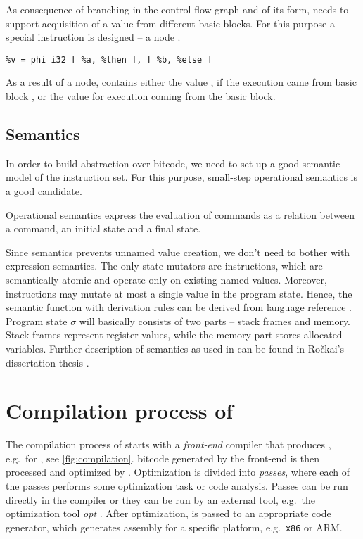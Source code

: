 As consequence of branching in the control flow graph and of its \SSA form, \LLVM needs to
support acquisition of a value from different basic blocks. For this
purpose a special instruction is designed -- a  node \cite{Cytron91}.

\begin{verbatim}
%v = phi i32 [ %a, %then ], [ %b, %else ]
\end{verbatim}

As a result of a  node,  contains either the value ,
if the execution came from basic block , or the value  for execution
coming from the  basic block.

\subsection{Semantics} \label{subsec:semantics}

In order to build abstraction over \LLVM bitcode, we need to set up a good
semantic model of the instruction set. For this purpose, small-step operational
semantics \cite{Plotkin04} is a good candidate.

\begin{definition}
Operational semantics express the evaluation of commands as a relation between
a command, an initial state and a final state.
\end{definition}

\noindent
Since \LLVMIR semantics prevents unnamed value creation, we don't need to
bother with expression semantics. The only state mutators are instructions, which are
semantically atomic and operate only on existing named values. Moreover,
instructions may mutate at most a single value in the program state. Hence, the
semantic function with derivation rules can be derived from \LLVM
language reference \cite{LLVM:langref}. Program state $\sigma$ will basically
consists of two parts -- stack frames and memory. Stack frames represent
register values, while the memory part stores allocated variables.
Further description of \LLVM semantics as used in \DIVINE can be found in Ročkai's
dissertation thesis \cite{Rockai15}.

\section{Compilation process of \LLVM} \label{sec:compilation}

The compilation process of \LLVM starts with a \emph{front-end} compiler that produces
\LLVMIR, e.g.~\clang for \Cpp{}, see \autoref{fig:compilation}.
\LLVM bitcode generated by the front-end is then processed and optimized by \LLVM.
Optimization is divided into \LLVM \emph{passes}, where each of the passes
performs some optimization task or code analysis. Passes can be run directly
in the compiler or they can be run by an external tool, e.g.~the \LLVM
optimization tool \emph{opt} \cite{LLVM:opt}. After optimization, \LLVMIR is passed to
an appropriate code generator, which generates assembly for a specific
platform, e.g.~\texttt{x86} or ARM.

